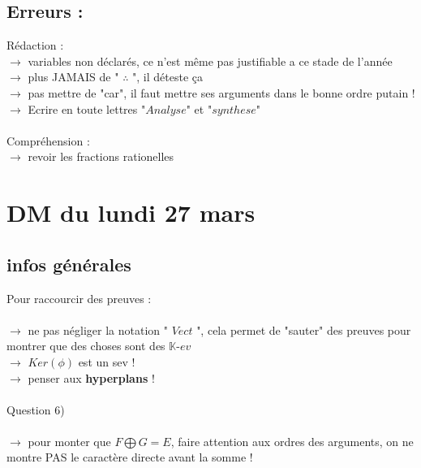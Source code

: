 \documentclass{book}
\begin{document}
\subsection{Erreurs : }

Rédaction : \\
$\rightarrow$ variables non déclarés, ce n'est même pas justifiable a ce stade de l'année \\
$\rightarrow$ plus JAMAIS de " $\therefore$ ", il déteste ça \\
$\rightarrow$ pas mettre de "car", il faut mettre ses arguments dans le bonne ordre putain ! \\
$\rightarrow$ Ecrire en toute lettres "$Analyse$" et "$synthese$" \\ \\

Compréhension : \\
$\rightarrow$ revoir les fractions rationelles




\section{DM du lundi 27 mars }

\begin{tcolorbox}[width={14cm},colback={yellow!20!white},title={\textbf{Commentaire générale sur ce DM}},colbacktitle=red!40!white,coltitle=black]    
	
\end{tcolorbox}


\subsection{infos générales}

Pour raccourcir des preuves : \\ \\
$\rightarrow$ ne pas négliger la notation " $Vect$ ", cela permet de "sauter" des preuves pour montrer que des choses sont des $\mathbb{K}$-$ev$ \\
$\rightarrow$ $Ker(\phi)$ est un sev ! \\
$\rightarrow$ penser aux \textbf{hyperplans} ! \\ \\

Question 6) \\ \\
$\rightarrow$ pour monter que $F \bigoplus G = E$, faire attention aux ordres des arguments, on ne montre PAS le caractère directe avant la somme !
\end{document}

